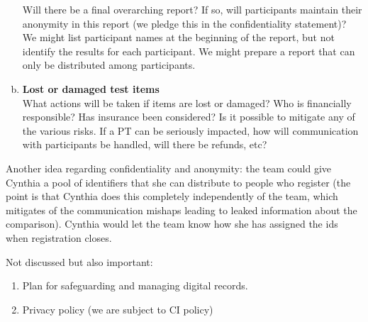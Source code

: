 \begin{enumerate}[a)]
Will there be a final overarching report? If so, will participants maintain their anonymity in this report (we pledge this in the confidentiality statement)? We might list participant names at the beginning of the report, but not identify the results for each participant. We might prepare a report that can only be distributed among participants.

\item	\textbf{Lost or damaged test items} \\
What actions will be taken if items are lost or damaged? Who is financially responsible? Has insurance been considered? Is it possible to mitigate any of the various risks. If a PT can be seriously impacted, how will communication with participants be handled, will there be refunds, etc?

\end{enumerate}

Another idea regarding confidentiality and anonymity: the team could give Cynthia a pool of identifiers that she can distribute to people who register (the point is that Cynthia does this completely independently of the team, which mitigates of the communication mishaps leading to leaked information about the comparison). Cynthia would let the team know how she has assigned the ids when registration closes.
 

Not discussed but also important: 
\begin{enumerate}
\item	Plan for safeguarding and managing digital records.
\item	Privacy policy (we are subject to CI policy)
\end{enumerate}